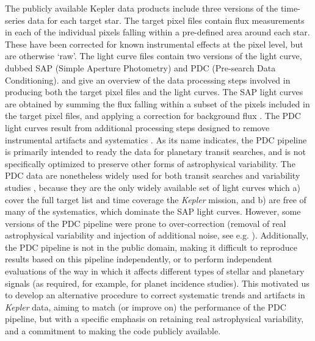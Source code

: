 \documentclass[useAMS,usenatbib]{mn2e}
\begin{document}
The publicly available Kepler data products
\citep{KeplerArchiveManual} include three versions of the time-series
data for each target star. The target pixel files contain flux
measurements in each of the individual pixels falling within a
pre-defined area around each star. These have been corrected for known
instrumental effects at the pixel level, but are otherwise `raw'. The
light curve files contain two versions of the light curve, dubbed SAP
(Simple Aperture Photometry) and PDC (Pre-search Data
Conditioning). \citet{jen+10} and \citet{KeplerDataProcHandbook} give an overview
of the data processing steps involved in producing both the target
pixel files and the light curves. The SAP light curves are obtained by
summing the flux falling within a subset of the pixels included in the
target pixel files, and applying a correction for background flux
\citep{twi+10a}. The PDC light curves result from additional
processing steps designed to remove instrumental artifacts and
systematics \citep{stu+12a,smi+12}.  As its name indicates, the PDC
pipeline is primarily intended to ready the data for planetary transit
searches, and is not specifically optimized to preserve other forms of
astrophysical variability. The PDC data are nonetheless widely used
for both transit searches and variability studies \citep[for example stellar rotation studies,
see e.g.][]{rei+13,nie+13,mcq+13a,mcq+13b,mcq+14}, because they are
the only widely available set of light curves which a) cover the full target list and time coverage the \emph{Kepler} mission, and b) are free of many of the
systematics, which dominate the SAP light curves. However, some versions of the PDC pipeline were prone to over-correction (removal of real astrophysical
variability and injection of additional noise, see
e.g. \citealt{rob+13}). Additionally, the PDC pipeline is not in the public domain, making it difficult to reproduce results based on this pipeline independently, or to perform independent evaluations of the way in which it affects different types of stellar and planetary signals (as required, for example, for planet incidence studies). This motivated us to develop an alternative procedure to correct systematic trends and artifacts in \emph{Kepler} data, aiming to match (or improve on) the performance of the PDC pipeline, but with a specific
emphasis on retaining real astrophysical variability, and a commitment to making the code publicly available. 
\end{document}
